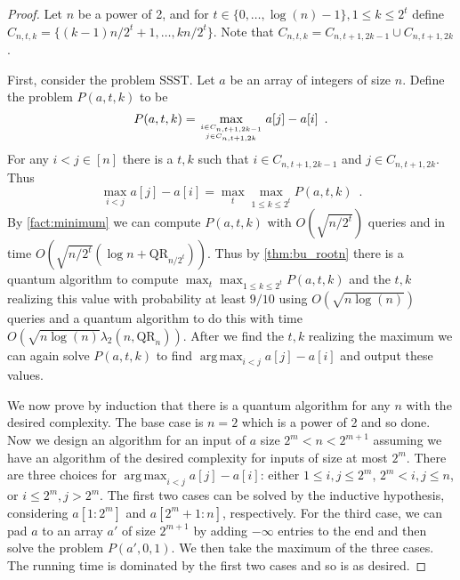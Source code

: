 \documentclass[12pt]{article}
\newcommand{\qr}{\mathrm{QR}}
\DeclareMathOperator*{\argmax}{arg\,max}
\newcommand{\upto}{\mathbin{:}}
\newcommand{\SSST}{\textsc{SSST}}
\theoremstyle{definition}
\begin{document}
\begin{proof}
Let $n$ be a power of 2, and for $t \in \{0, \ldots, \log(n) -1\}, 1\le k \le 2^t$ define  $C_{n, t, k} = \{(k-1)n/2^t + 1, \ldots, kn/2^t\}$. Note that $C_{n, t, k} = C_{n, t+1, 2k-1} \cup C_{n, t+1, 2k}$.

First, consider the problem \SSST.  Let $a$ be an array of integers of size $n$.  Define the problem $P(a, t, k)$ to be
\[
P(a, t, k) = \max_{i \in C_{n, t+1, 2k-1} \atop j \in C_{n, t+1, 2k}} a[j] - a[i] \enspace.
\]
For any $i < j \in [n]$ there is a $t, k$ such that $i \in C_{n, t+1, 2k-1}$ and $j \in C_{n, t+1, 2k}$.  Thus 
\[
\max_{i < j} a[j] - a[i] = \max_t \max_{1 \le k \le 2^t} P(a, t, k) \enspace .
\]
By \cref{fact:minimum} we can compute $P(a, t, k)$ with $O(\sqrt{n/2^t})$ queries and in time $O(\sqrt{n/2^t} (\log n + \qr_{n/2^t}))$.  Thus by \cref{thm:bu_rootn} there is a quantum algorithm to compute $\max_t\max_{1 \le k \le 2^t} P(a, t, k)$ and the $t,k$ realizing this value with probability at least $9/10$ using $O(\sqrt{n\log(n)})$ queries and a quantum algorithm to do this with time $O(\sqrt{n\log(n)}\lambda_2(n, \qr_n))$.
After we find the $t,k$ realizing the maximum we can again solve $P(a, t, k)$ to find $\argmax_{i < j} a[j] - a[i]$ and output these values.

We now prove by induction that there is a quantum algorithm for any $n$ with the desired complexity.  The base case is $n=2$ which is a power of 2 and so done.
Now we design an algorithm for an input of $a$ size $2^m < n < 2^{m+1}$ assuming we have an algorithm of the desired complexity for inputs of size at most $2^m$.  
There are three choices for $\argmax_{i < j} a[j] - a[i]$: either $1 \le i,j \le 2^m$, $2^m < i,j \le n$, or $i \le 2^m, j > 2^m$.  The first two cases can be solved by the inductive hypothesis, considering $a[1 \upto 2^m]$ and $a[2^m +1 \upto n]$, respectively.  For the third case, we can pad $a$ to an array $a'$ of size $2^{m+1}$ by adding $-\infty$ entries to the end and then solve the problem $P(a', 0, 1)$.  We then take the maximum of the three cases.  The running time is dominated by the first two cases and so is as desired.


\end{proof}
\end{document}
